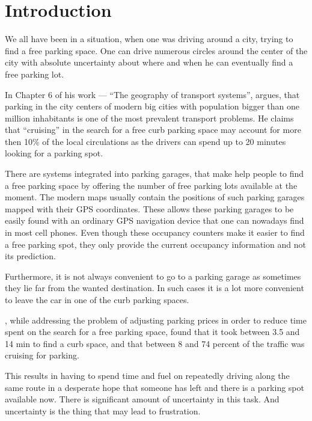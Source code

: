 \chapter{Introduction} %
\label{cha:introduction}

We all have been in a situation, when one was driving around a city,
trying to find a free parking space. One can drive numerous circles around
the center of the city with absolute uncertainty about where and when he
can eventually find a free parking lot.

In Chapter 6 of his work --- ``The geography of transport systems'',
\citet{rodrigue2013geography} argues, that parking in the city centers of
modern big cities with population bigger than one million inhabitants is
one of the most prevalent transport problems. He claims that ``cruising''
in the search for a free curb parking space may account for more then 10\%
of the local circulations as the drivers can spend up to 20 minutes
looking for a parking spot.

There are systems integrated into parking garages, that make help people
to find a free parking space by offering the number of free parking lots
available at the moment. The modern maps usually contain the positions of
such parking garages mapped with their GPS coordinates. These allows these
parking garages to be easily found with an ordinary GPS navigation device
that one can nowadays find in most cell phones. Even though these
occupancy counters make it easier to find a free parking spot, they only
provide the current occupancy information and not its prediction.

Furthermore, it is not always convenient to go to a parking garage as
sometimes they lie far from the wanted destination. In such cases it is a
lot more convenient to leave the car in one of the curb parking spaces.

\citet{shoup2006cruising}, while addressing the problem of adjusting parking
prices in order to reduce time spent on the search for a free parking space,
found that it took between 3.5 and 14 min to find a curb space, and that
between 8 and 74 percent of the traffic was cruising for parking.

This results in having to spend time and fuel on repeatedly driving along the
same route in a desperate hope that someone has left and there is a parking
spot available now. There is significant amount of uncertainty in this task.
And uncertainty is the thing that may lead to frustration.

